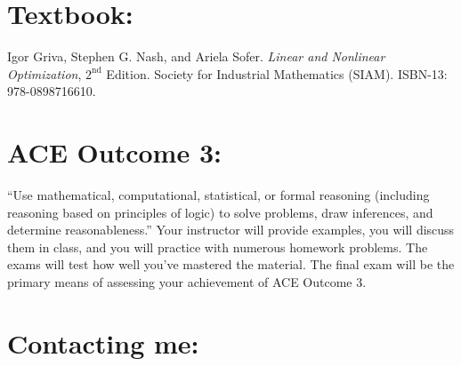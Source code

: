 \documentclass[margin]{res}
\theoremstyle{plain}
\theoremstyle{definition}
\theoremstyle{remark}
\begin{document}
\begin{resume}

\section{Textbook:} Igor Griva, Stephen G. Nash, and Ariela Sofer.  \textit{Linear and Nonlinear Optimization}, $2^{\text{nd}}$ Edition. Society for Industrial Mathematics (SIAM). ISBN-13: 978-0898716610.


% 

\section{ACE Outcome 3:}``Use mathematical, computational, statistical, or formal reasoning (including reasoning based on principles of logic) to solve problems, draw inferences, and determine reasonableness.'' Your instructor will provide examples, you will discuss them in class, and you will practice with numerous homework problems. The exams will test how well you've mastered the material.  The final exam will be the primary means of assessing your achievement of ACE Outcome 3.

\section{Contacting me:}


\end{resume}
\end{document}
